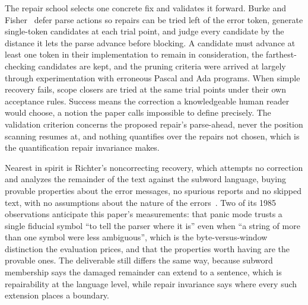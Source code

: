 \documentclass[11pt,a4paper]{article}
\theoremstyle{definition}
\theoremstyle{plain}
\theoremstyle{remark}
\begin{document}
The repair school selects one concrete fix and validates it forward. Burke and Fisher~\citep{burke1987repair} defer
parse actions so repairs can be tried left of the error token, generate single-token candidates at each trial point, and
judge every candidate by the distance it lets the parse advance before blocking. A candidate must advance at least one
token in their implementation to remain in consideration, the farthest-checking candidates are kept, and the pruning
criteria were arrived at largely through experimentation with erroneous Pascal and Ada programs. When simple recovery
fails, scope closers are tried at the same trial points under their own acceptance rules. Success means the correction a
knowledgeable human reader would choose, a notion the paper calls impossible to define precisely. The validation
criterion concerns the proposed repair's parse-ahead, never the position scanning resumes at, and nothing quantifies
over the repairs not chosen, which is the quantification repair invariance makes.

Nearest in spirit is Richter's noncorrecting recovery, which attempts no correction and analyzes the remainder of the
text against the subword language, buying provable properties about the error messages, no spurious reports and no
skipped text, with no assumptions about the nature of the errors~\citep{richter1985noncorrecting}. Two of its 1985
observations anticipate this paper's measurements: that panic mode trusts a single fiducial symbol ``to tell the parser
where it is'' even when ``a string of more than one symbol were less ambiguous'', which is the byte-versus-window
distinction the evaluation prices, and that the properties worth having are the provable ones. The deliverable still
differs the same way, because subword membership says the damaged remainder can extend to a sentence, which is
repairability at the language level, while repair invariance says where every such extension places a boundary.
\end{document}
